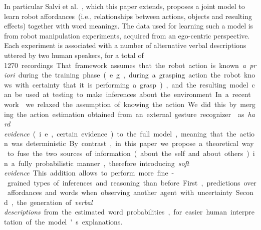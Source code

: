 In particular Salvi et al.~\cite{salvi:2012:smcb}, which this paper extends, proposes a joint model to learn robot affordances~(i.e., relationships between actions, objects and resulting effects) together with word meanings.
The data used for learning such a model is from robot manipulation experiments, acquired from an ego-centric perspective.
Each experiment is associated with a number of alternative verbal descriptions uttered by two human speakers, for a total of \SI{1270}~recordings.
That framework assumes that the robot action is known \emph{a~priori} during the training phase~(e.g., during a grasping action the robot knows with certainty that it is performing a grasp), and the resulting model can be used at testing to make inferences about the environment.
In a recent work~\cite{saponaro:2017:glu} we relaxed the assumption of knowing the action.
We did this by merging the action estimation obtained from an external gesture recognizer~\cite{saponaro:2013:crhri} as \emph{hard evidence}~(i.e., certain evidence) to the full model, meaning that the action was deterministic.
By contrast, in this paper we propose a theoretical way to fuse the two sources of information~(about the self and about others) in a fully probabilistic manner, therefore introducing \emph{soft evidence}.
This addition allows to perform more fine-grained types of inferences and reasoning than before.
First, predictions over affordances and words when observing another agent with uncertainty.
Second, the generation of \emph{verbal descriptions} from the estimated word probabilities, for easier human interpretation of the model's explanations.
